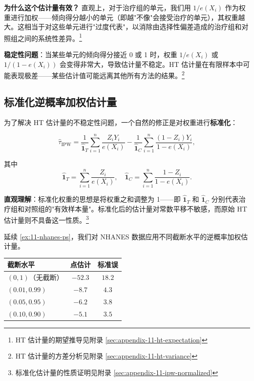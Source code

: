 \textbf{为什么这个估计量有效？} 直观上，对于治疗组的单元，我们用 $1/e(X_i)$ 作为权重进行加权——倾向得分越小的单元（即越"不像"会接受治疗的单元），其权重越大。这相当于对这些单元进行"过度代表"，以消除由选择性偏差造成的治疗组和对照组之间的系统性差异。\footnote{HT 估计量的期望推导见附录 \cref{sec:appendix-11-ht-expectation}}

\textbf{稳定性问题}：当某些单元的倾向得分接近 0 或 1 时，权重 $1/e(X_i)$ 或 $1/(1-e(X_i))$ 会变得非常大，导致估计量不稳定。HT 估计量在有限样本中可能表现极差——某些估计值可能远离其他所有方法的结果。\footnote{HT 估计量的方差分析见附录 \cref{sec:appendix-11-ht-variance}}

\subsection{标准化逆概率加权估计量}\label{sec:11-normalized-ipw}

为了解决 HT 估计量的不稳定性问题，一个自然的修正是对权重进行\textbf{标准化}：

\[
\hat\tau_{\text{IPW}} = \frac{1}{\hat{\mathbf{1}}_T} \sum_{i=1}^n \frac{Z_i Y_i}{e(X_i)} - \frac{1}{\hat{\mathbf{1}}_C} \sum_{i=1}^n \frac{(1-Z_i) Y_i}{1-e(X_i)} ,
\label{eq:11-ipw-estimator}
\]

其中
\[
\hat{\mathbf{1}}_T = \sum_{i=1}^n \frac{Z_i}{e(X_i)}, \quad \hat{\mathbf{1}}_C = \sum_{i=1}^n \frac{1-Z_i}{1-e(X_i)} .
\]

\textbf{直观理解}：标准化权重的思想是将权重之和调整为 1——即 $\hat{\mathbf{1}}_T$ 和 $\hat{\mathbf{1}}_C$ 分别代表治疗组和对照组的"有效样本量"。标准化后的估计量对常数平移不敏感，而原始 HT 估计量则不具备这一性质。\footnote{标准化估计量的性质证明见附录 \cref{sec:appendix-11-ipw-normalized}}

\begin{Example}\label{ex:11-ipw-nhanes}
延续 \cref{ex:11-nhanes-ps}，我们对 NHANES 数据应用不同截断水平的逆概率加权估计量。
\label{tab:11-ipw-truncation}
\begin{center}
\begin{tabular}{lcc}
\toprule
截断水平 & 点估计 & 标准误 \\
\midrule
$(0, 1)$（无截断） & $-52.3$ & $18.2$ \\
$(0.01, 0.99)$ & $-8.7$ & $4.3$ \\
$(0.05, 0.95)$ & $-6.2$ & $3.8$ \\
$(0.10, 0.90)$ & $-5.1$ & $3.5$ \\
\bottomrule
\end{tabular}
\end{center}
\end{Example}

